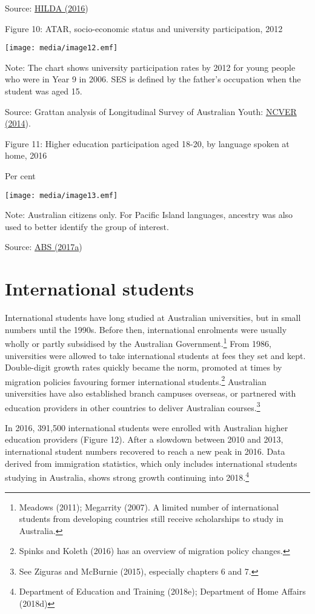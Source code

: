 \documentclass[]{book}
\begin{document}
Source: \protect\hyperlink{_ENREF_130}{HILDA (2016})

\protect\hypertarget{_Ref518647628}{}{}Figure 10: ATAR, socio-economic status and university participation, 2012

\texttt{[image: media/image12.emf]}

Note: The chart shows university participation rates by 2012 for young people who were in Year 9 in 2006. SES is defined by the father's occupation when the student was aged 15.

Source: Grattan analysis of Longitudinal Survey of Australian Youth: \protect\hyperlink{_ENREF_154}{NCVER (2014}).

\protect\hypertarget{_Ref518647887}{}{}Figure 11: Higher education participation aged 18-20, by language spoken at home, 2016

Per cent

\texttt{[image: media/image13.emf]}

Note: Australian citizens only. For Pacific Island languages, ancestry was also used to better identify the group of interest.

Source: \protect\hyperlink{_ENREF_4}{ABS (2017a})

\hypertarget{international-students}{%
\section{International students }\label{international-students}}

International students have long studied at Australian universities, but in small numbers until the 1990s. Before then, international enrolments were usually wholly or partly subsidised by the Australian Government.\footnote{Meadows (2011); Megarrity (2007). A limited number of international students from developing countries still receive scholarships to study in Australia.} From 1986, universities were allowed to take international students at fees they set and kept. Double-digit growth rates quickly became the norm, promoted at times by migration policies favouring former international students.\footnote{Spinks and Koleth (2016) has an overview of migration policy changes.} Australian universities have also established branch campuses overseas, or partnered with education providers in other countries to deliver Australian courses.\footnote{See Ziguras and McBurnie (2015), especially chapters 6 and 7.}

In 2016, 391,500 international students were enrolled with Australian higher education providers (Figure 12). After a slowdown between 2010 and 2013, international student numbers recovered to reach a new peak in 2016. Data derived from immigration statistics, which only includes international students studying in Australia, shows strong growth continuing into 2018.\footnote{Department of Education and Training (2018e); Department of Home Affairs (2018d)}
\end{document}
